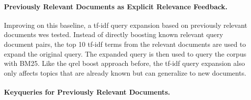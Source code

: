 \paragraph{Previously Relevant Documents as Explicit Relevance Feedback.} Improving on this baseline, a tf-idf query expansion based on previously relevant documents wes tested. Instead of directly boosting known relevant query document pairs, the top 10 tf-idf terms from the relevant documents are used to expand the original query. The expanded query is then used to query the corpus with BM25. Like the qrel boost approach before, the tf-idf query expansion also only affects topics that are already known but can generalize to new documents.


\paragraph{Keyqueries for Previously Relevant Documents.}

